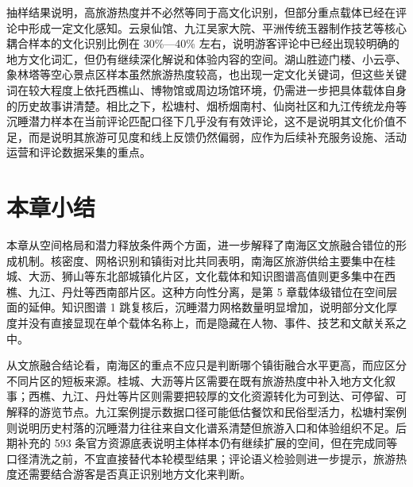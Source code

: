 抽样结果说明，高旅游热度并不必然等同于高文化识别，但部分重点载体已经在评论中形成一定文化感知。云泉仙馆、九江吴家大院、平洲传统玉器制作技艺等核心耦合样本的文化识别比例在 30\%---40\% 左右，说明游客评论中已经出现较明确的地方文化词汇，但仍有继续深化解说和体验内容的空间。湖山胜迹门楼、小云亭、象林塔等空心景点区样本虽然旅游热度较高，也出现一定文化关键词，但这些关键词在较大程度上依托西樵山、博物馆或周边场馆环境，仍需进一步把具体载体自身的历史故事讲清楚。相比之下，松塘村、烟桥烟南村、仙岗社区和九江传统龙舟等沉睡潜力样本在当前评论匹配口径下几乎没有有效评论，这不是说明其文化价值不足，而是说明其旅游可见度和线上反馈仍然偏弱，应作为后续补充服务设施、活动运营和评论数据采集的重点。

\section{本章小结}\label{chap06-summary}

本章从空间格局和潜力释放条件两个方面，进一步解释了南海区文旅融合错位的形成机制。核密度、网格识别和镇街对比共同表明，南海区旅游供给主要集中在桂城、大沥、狮山等东北部城镇化片区，文化载体和知识图谱高值则更多集中在西樵、九江、丹灶等西南部片区。这种方向性分离，是第 5 章载体级错位在空间层面的延伸。知识图谱 1 跳复核后，沉睡潜力网格数量明显增加，说明部分文化厚度并没有直接显现在单个载体名称上，而是隐藏在人物、事件、技艺和文献关系之中。

从文旅融合结论看，南海区的重点不应只是判断哪个镇街融合水平更高，而应区分不同片区的短板来源。桂城、大沥等片区需要在既有旅游热度中补入地方文化叙事；西樵、九江、丹灶等片区则需要把较厚的文化资源转化为可到达、可停留、可解释的游览节点。九江案例提示数据口径可能低估餐饮和民俗型活力，松塘村案例则说明历史村落的沉睡潜力往往来自文化谱系清楚但旅游入口和体验组织不足。后期补充的 593 条官方资源底表说明主体样本仍有继续扩展的空间，但在完成同等口径清洗之前，不宜直接替代本轮模型结果；评论语义检验则进一步提示，旅游热度还需要结合游客是否真正识别地方文化来判断。
